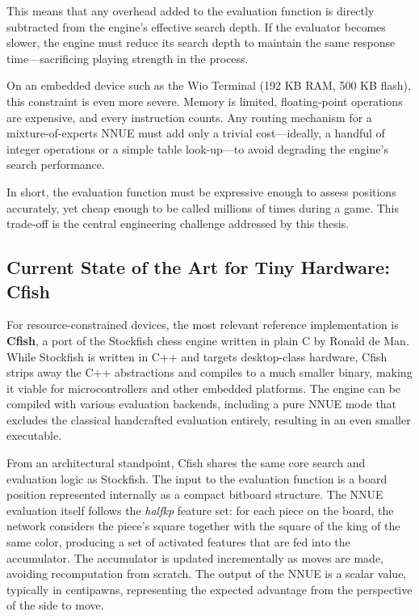 This means that any overhead added to the evaluation function is directly subtracted from the engine's effective search depth. If the evaluator becomes slower, the engine must reduce its search depth to maintain the same response time---sacrificing playing strength in the process.

On an embedded device such as the Wio Terminal (192 KB RAM, 500 KB flash), this constraint is even more severe. Memory is limited, floating-point operations are expensive, and every instruction counts. Any routing mechanism for a mixture-of-experts NNUE must add only a trivial cost---ideally, a handful of integer operations or a simple table look-up---to avoid degrading the engine's search performance.


In short, the evaluation function must be expressive enough to assess positions accurately, yet cheap enough to be called millions of times during a game. This trade-off is the central engineering challenge addressed by this thesis.


\subsection{Current State of the Art for Tiny Hardware: Cfish}

For resource-constrained devices, the most relevant reference implementation is \textbf{Cfish}, a port of the Stockfish chess engine written in plain C by Ronald de Man. While Stockfish is written in C++ and targets desktop-class hardware, Cfish strips away the C++ abstractions and compiles to a much smaller binary, making it viable for microcontrollers and other embedded platforms. The engine can be compiled with various evaluation backends, including a pure NNUE mode that excludes the classical handcrafted evaluation entirely, resulting in an even smaller executable.

From an architectural standpoint, Cfish shares the same core search and evaluation logic as Stockfish. The input to the evaluation function is a board position represented internally as a compact bitboard structure. The NNUE evaluation itself follows the \emph{halfkp} feature set: for each piece on the board, the network considers the piece's square together with the square of the king of the same color, producing a set of activated features that are fed into the accumulator. The accumulator is updated incrementally as moves are made, avoiding recomputation from scratch. The output of the NNUE is a scalar value, typically in centipawns, representing the expected advantage from the perspective of the side to move.

